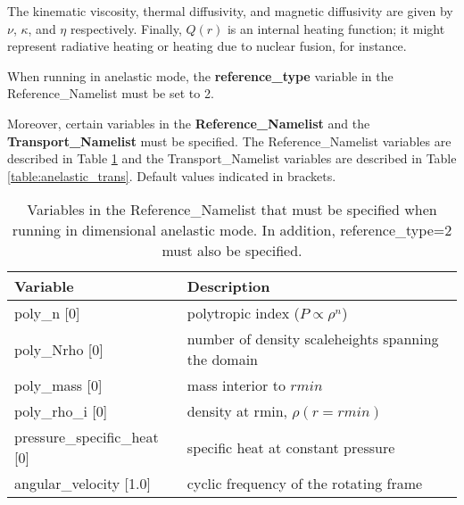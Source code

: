 The kinematic viscosity, thermal diffusivity, and magnetic diffusivity are given by $\nu$, $\kappa$, and $\eta$ respectively.  Finally, $Q(r)$ is an internal heating function; it might represent radiative heating or heating due to nuclear fusion, for instance.    


When running in anelastic mode, the \textbf{reference\_type} variable in the Reference\_Namelist must be set to 2.

Moreover, certain variables in the \textbf{Reference\_Namelist} and the \textbf{Transport\_Namelist} must be specified.  The Reference\_Namelist variables are described in Table \ref{table:anelastic} and the Transport\_Namelist variables are described in Table \ref{table:anelastic_trans}. Default values indicated in brackets.  

\begin{table}
\centering
\begin{tabular}{| l | l |}
\hline
Variable & Description \\
\hline
poly\_n [0]                  & polytropic index ($P\propto\rho^n$) \\
poly\_Nrho [0]               & number of density scaleheights spanning the domain \\
poly\_mass [0]               & mass interior to $rmin$ \\
poly\_rho\_i [0]             & density at rmin, $\rho(r=rmin)$ \\
pressure\_specific\_heat [0] & specific heat at constant pressure \\
angular\_velocity [1.0]      & cyclic frequency of the rotating frame \\
\hline
\end{tabular}
\caption{\label{table:anelastic} Variables in the Reference\_Namelist that must be specified when running in dimensional anelastic mode. In addition, reference\_type=2 must also be specified.}
\end{table}

